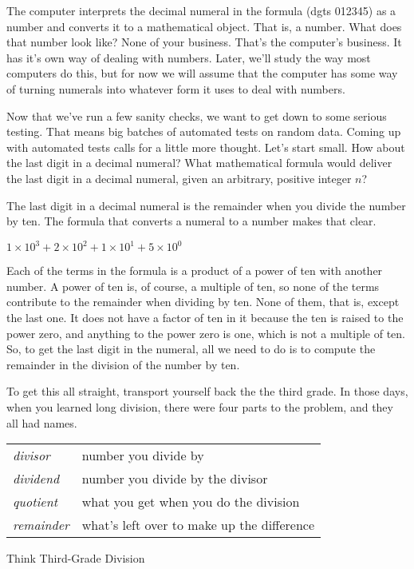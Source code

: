 
The computer interprets the decimal numeral in the formula (dgts 012345)
as a number and converts it to a mathematical object. That is, a number.
What does that number look like? None of your business.
That's the computer's business.
It has it's own way of dealing with numbers.
Later, we'll study the way most computers do this,
but for now we will assume that the computer has some way of turning
numerals into whatever form it uses to deal with numbers.

Now that we've run a few sanity checks, we want to get down to some serious testing.
That means big batches of automated tests on random data.
Coming up with automated tests calls for a little more thought.
Let's start small. How about the last digit in a decimal numeral?
What mathematical formula would deliver the last digit in a
decimal numeral, given an arbitrary, positive integer $n$?

The last digit in a decimal numeral is the remainder when you divide
the number by ten. The formula that converts a numeral to a number
makes that clear.
\begin{center}
$1 \times 10^3 + 2 \times 10^2 + 1 \times 10^1 + 5 \times 10^0$
\end{center}

Each of the terms in the formula is a product of a power
of ten with another number. A power of ten is, of course,
a multiple of ten, so none of the terms contribute to the remainder
when dividing by ten. None of them, that is, except the last one.
It does not have a factor of ten in it because the ten is raised to the
power zero, and anything to the power zero is one, which is not a multiple of ten.
So, to get the last digit in the numeral, all we need to do is to
compute the remainder in the division of the number by ten.

\begin{aside}
To get this all straight,
transport yourself back the the third grade.
In those days, when you learned long division,
there were four parts to the problem,
and they all had names.

\begin{tabular}{ll}
\emph{divisor}   & number you divide by \\
\emph{dividend}  & number you divide by the divisor \\
\emph{quotient}  & what you get when you do the division \\
\emph{remainder} & what's left over to make up the difference
\end{tabular}
\caption{Think Third-Grade Division}
\label{third-grade-division}
\end{aside}

